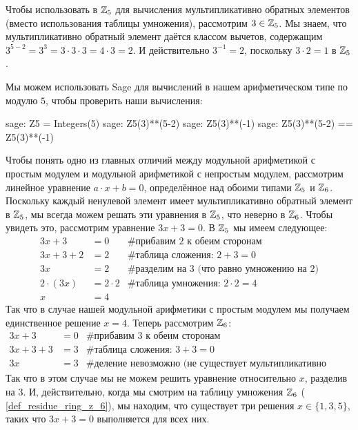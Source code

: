 \begin{example} 
Чтобы использовать  в $\mathbb{Z}_5$ для вычисления мультипликативно обратных элементов (вместо использования таблицы умножения), рассмотрим $3\in\mathbb{Z}_5$. Мы знаем, что мультипликативно обратный элемент даётся классом вычетов, содержащим $3^{5-2}=3^3=3\cdot 3\cdot 3= 4\cdot 3 = 2$. И действительно $3^{-1}=2$, поскольку $3\cdot 2 =1$ в $\mathbb{Z}_5$.

Мы можем использовать Sage для вычислений в нашем арифметическом типе по модулю $5$, чтобы проверить наши вычисления:
\begin{sagecommandline}
sage: Z5 = Integers(5)
sage: Z5(3)**(5-2)
sage: Z5(3)**(-1)
sage: Z5(3)**(5-2) == Z5(3)**(-1)
\end{sagecommandline}
\end{example}
\begin{example}
Чтобы понять одно из главных отличий между модульной арифметикой с простым модулем и модульной арифметикой с непростым модулем, рассмотрим линейное уравнение $a\cdot x +b=0$, определённое над обоими типами $\mathbb{Z}_5$ и $\mathbb{Z}_6$. Поскольку каждый ненулевой элемент имеет мультипликативно обратный элемент в $\mathbb{Z}_5$, мы всегда можем решать эти уравнения в $\mathbb{Z}_5$, что неверно в $\mathbb{Z}_6$. Чтобы увидеть это, рассмотрим уравнение $3x+3=0$. В $\mathbb{Z}_5$ мы имеем следующее:
\begin{align*}
3x+3    &= 0 & \text{\# прибавим 2 к обеим сторонам} \\
3x+3+2  &= 2 & \text{\# таблица сложения: } 2+3 = 0 \\
3x      &= 2 & \text{\# разделим на } 3  \text{ (что равно умножению на 2)}\\
2\cdot(3x)      &= 2\cdot 2 & \text{\# таблица умножения: } 2\cdot 2=4 \\
 x      &= 4 &
\end{align*}
Так что в случае нашей модульной арифметики с простым модулем мы получаем единственное решение $x=4$. Теперь рассмотрим $\mathbb{Z}_6$:
\begin{align*}
3x+3    &= 0 & \text{\# прибавим 3 к обеим сторонам} \\
3x+3+3  &= 3 & \text{\# таблица сложения: } 3+3 = 0 \\
3x      &= 3 & \text{\# деление невозможно (не существует мультипликативно обратного элемента 3)}
\end{align*}
Так что в этом случае мы не можем решить уравнение относительно $x$, разделив на $3$. И, действительно, когда мы смотрим на таблицу умножения $\mathbb{Z}_6$ (\examplename{} \ref{def_residue_ring_z_6}), мы находим, что существует три решения $x\in\{1,3,5\}$, таких что $3x+3=0$ выполняется для всех них.
\end{example}
